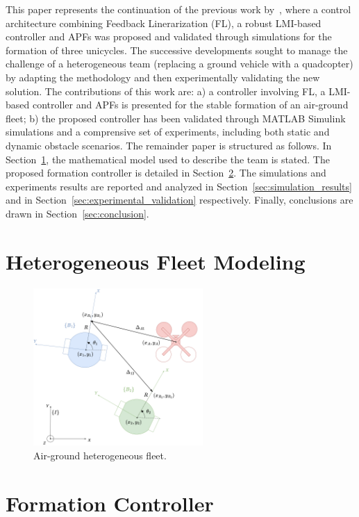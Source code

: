 \documentclass{ifacconf}
\begin{document}
This paper represents the continuation of the previous work by~\cite{Morando2025SOSE},
where a control architecture combining Feedback Linerarization (FL), 
a robust LMI-based controller and APFs was proposed 
and validated through simulations for 
the formation of three unicycles.
The successive developments sought to manage the challenge
of a heterogeneous team (replacing a ground vehicle with a quadcopter)
by adapting the methodology and then experimentally validating 
the new solution.
The contributions of this work are: a) a controller involving FL, a LMI-based controller and APFs 
is presented for the stable formation of an air-ground fleet;
b) the proposed controller has been validated through MATLAB Simulink
simulations and a comprensive set of experiments, including both static
and dynamic obstacle scenarios.
The remainder paper is structured as follows. 
In Section~\ref{sec:heterogeneous_fleet_modeling}, 
the mathematical model used to describe the team is stated.
The proposed formation controller is detailed in Section~\ref{sec:formation_controller}.
The simulations and experiments results are reported and analyzed
in Section~\ref{sec:simulation_results} and 
in Section~\ref{sec:experimental_validation} respectively.
Finally, conclusions are drawn in Section~\ref{sec:conclusion}.

\section{Heterogeneous Fleet Modeling}
\label{sec:heterogeneous_fleet_modeling}

\begin{figure}
    \centering
    \includegraphics[height=6cm]{images/heterogenous_fleet_PNG300.png}
    \caption{Air-ground heterogeneous fleet.}
    \label{fig:airground-fleet}
\end{figure}

\section{Formation Controller}
\label{sec:formation_controller}
\end{document}
